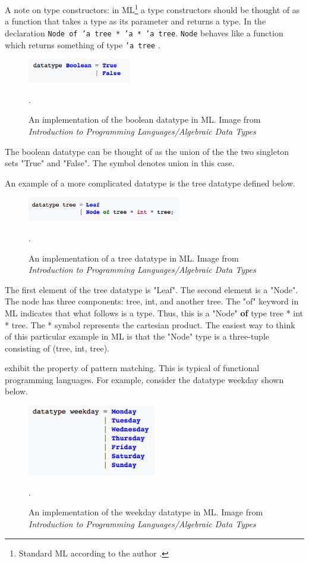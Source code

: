 \documentclass[../../main/main.tex]{subfiles}
\begin{document}
A note on type constructors: in ML\footnote{Standard ML according to the author \cite{constructor}.} a type constructors should be thought of as a function that takes a type as its parameter and returns a type.  In the declaration \texttt{Node of 'a tree * 'a * 'a tree}. \texttt{Node} behaves like a function which returns something of type \texttt{'a tree} \cite{constructor}.  

\begin{figure}[h]
\centering
\includegraphics[width=0.4\textwidth]{../figures/booladt}
\caption{\label{booladt} An implementation of the boolean datatype in ML.  Image from \textit{Introduction to Programming Languages/Algebraic Data Types} \cite{types} }.  
\end{figure}

The boolean datatype can be thought of as the union of the the two singleton sets "True" and "False".  The \textbar symbol denotes union in this case.  

An example of a more complicated datatype is the tree datatype defined below.

\begin{figure}[h]
\centering
\includegraphics[width=0.6\textwidth]{../figures/tree}
\caption{\label{tree} An implementation of a tree datatype in ML.  Image from \textit{Introduction to Programming Languages/Algebraic Data Types} \cite{types} }.  
\end{figure}

The first element of the tree datatype is "Leaf".  The second element is a "Node".  The node has three components: tree, int, and another tree.  The "of" keyword in ML indicates that what follows is a type.  Thus, this is a "Node" \textbf{of} type tree * int * tree.  The * symbol represents the cartesian product.  The easiest way to think of this particular example in ML is that the "Node" type is a three-tuple consisting of (tree, int, tree).

 exhibit the property of pattern matching.  This is typical of functional programming languages.  For example, consider the datatype weekday shown below.

\begin{figure}[h]
\centering
\includegraphics[width=0.5\textwidth]{../figures/weekday}
\caption{\label{weekday} An implementation of the weekday datatype in ML.  Image from \textit{Introduction to Programming Languages/Algebraic Data Types} \cite{types} }.  
\end{figure}
\end{document}
